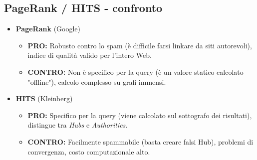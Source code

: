 \documentclass{article}
\begin{document}
  \subsection{PageRank / HITS - confronto}
    \begin{itemize}
        \item \textbf{PageRank} (Google)
          \begin{itemize}
              \item \textbf{PRO:} Robusto contro lo spam (è difficile farsi linkare da siti autorevoli), indice di qualità valido per l'intero Web.
              \item \textbf{CONTRO:} Non è specifico per la query (è un valore statico calcolato "offline"), calcolo complesso su grafi immensi.
          \end{itemize} 
        \item \textbf{HITS} (Kleinberg)
          \begin{itemize}
              \item \textbf{PRO:} Specifico per la query (viene calcolato sul sottografo dei risultati), distingue tra \textit{Hubs} e \textit{Authorities}.
              \item \textbf{CONTRO:} Facilmente spammabile (basta creare falsi Hub), problemi di convergenza, costo computazionale alto.
          \end{itemize}
    \end{itemize}
\end{document}
